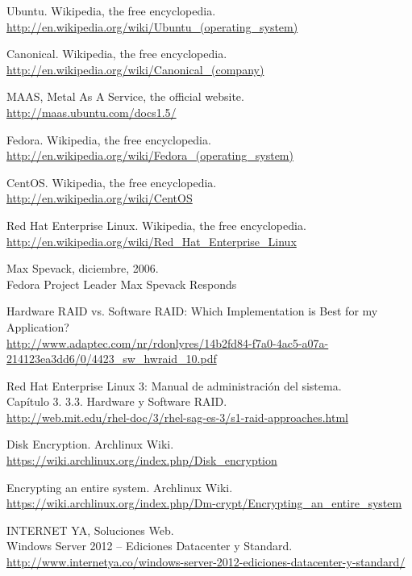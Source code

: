 \documentclass[paper=a4, fontsize=11pt]{scrartcl} %
\numberwithin{equation}{section} %
\numberwithin{figure}{section} %
\numberwithin{table}{section} %
\begin{document}
\begin{thebibliography}{10}
Ubuntu. Wikipedia, the free encyclopedia.\\
  \url{http://en.wikipedia.org/wiki/Ubuntu_(operating_system)}

Canonical. Wikipedia, the free encyclopedia.\\
  \url{http://en.wikipedia.org/wiki/Canonical_(company)}

MAAS, Metal As A Service, the official website.\\
  \url{http://maas.ubuntu.com/docs1.5/}

Fedora. Wikipedia, the free encyclopedia.\\
  \url{http://en.wikipedia.org/wiki/Fedora_(operating_system)}

CentOS. Wikipedia, the free encyclopedia.\\
  \url{http://en.wikipedia.org/wiki/CentOS}

Red Hat Enterprise Linux. Wikipedia, the free encyclopedia.\\
  \url{http://en.wikipedia.org/wiki/Red_Hat_Enterprise_Linux}

Max Spevack, diciembre, 2006.\\
  Fedora Project Leader Max Spevack Responds

Hardware RAID vs. Software RAID: Which Implementation is Best for my Application?\\
  \url{http://www.adaptec.com/nr/rdonlyres/14b2fd84-f7a0-4ac5-a07a-214123ea3dd6/0/4423_sw_hwraid_10.pdf}

Red Hat Enterprise Linux 3: Manual de administración del sistema.\\
  Capítulo 3. 3.3. Hardware y Software RAID.\\
  \url{http://web.mit.edu/rhel-doc/3/rhel-sag-es-3/s1-raid-approaches.html}

Disk Encryption. Archlinux Wiki.\\
  \url{https://wiki.archlinux.org/index.php/Disk_encryption}

Encrypting an entire system. Archlinux Wiki.\\
  \url{https://wiki.archlinux.org/index.php/Dm-crypt/Encrypting_an_entire_system}

INTERNET YA, Soluciones Web.\\
Windows Server 2012 – Ediciones Datacenter y Standard.\\
  \url{http://www.internetya.co/windows-server-2012-ediciones-datacenter-y-standard/}
\end{thebibliography}
\end{document}
